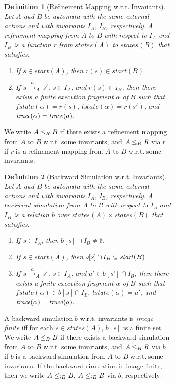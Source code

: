 \documentclass[11pt]{article}
\newcommand{\bn}{\begin{enumerate}}
\newcommand{\en}{\end{enumerate}}
\newcommand{\bd}{\begin{definition}}
\newcommand{\ed}{\end{definition}}
\newcommand{\intrdef}{\emph}	\newcommand{\intr}{\emph}
\newcommand{\ints}{\cap}
\newcommand{\lla}[2]{\mbox{$\, \stackrel{#1}{\longrightarrow}_{#2} \,$}}
\newcommand{\al}{\alpha}
\newcommand{\fstate}{\mathit{fstate}}
\newcommand{\lstate}{\mathit{lstate}}
\newcommand{\start}{\mathit{start}}
\newcommand{\states}{\mathit{states}}
\newtheorem{definition}{Definition}
\begin{document}
\begin{figure}[htb]
\begin{figure}[htb]
\bd[Refinement Mapping w.r.t. Invariants]
Let $A$ and $B$ be automata with the same external actions and with
invariants $I_A$, $I_B$, respectively. A \intrdef{refinement mapping}
from $A$ to $B$ with respect to $I_A$ and $I_B$
is a function $r$ from $\states(A)$ to $\states(B)$
that satisfies:
\bn

\item \label{clause:ref-inv:init} If $s \in \start(A)$, then
$r(s) \in \start(B)$.


\item \label{clause:ref-inv:trans}
If $s \lla{a}{A} s'$, $s \in I_A$, and $r(s) \in I_B$, then
there exists a finite execution fragment $\al$ of $B$ such that
$\fstate(\al) = r(s)$, 
$\lstate(\al) = r(s')$, and $\trace(\al) = \trace(a)$.

\en
\label{def:ref-inv}
\ed
We write $A \leq_R B$ if there exists a refinement mapping from $A$
to $B$ w.r.t. some invariants, and 
$A \leq_R B$ via $r$ if $r$ is a refinement mapping from
$A$ to $B$ w.r.t. some invariants.




\bd[Backward Simulation w.r.t. Invariants]
Let $A$ and $B$ be automata with the same external actions and with
invariants $I_A$, $I_B$, respectively. A \intrdef{backward simulation}
from $A$ to $B$ with respect to $I_A$ and $I_B$
is a relation $b$ over $\states(A) \times \states(B)$
that satisfies:
\bn

\item If $s \in I_A$, then $b[s] \ints I_B \ne \emptyset$.

\item \label{clause:back-sim-inv:init} 
If $s \in \start(A)$, then $b[s] \ints I_B \sub \start(B)$.


\item \label{clause:back-sim-inv:trans}
If $s \lla{a}{A} s'$, $s \in I_A$, and $u' \in b[s'] \ints I_B$, then
there exists a finite execution fragment $\al$ of $B$ such that
$\fstate(\al) \in b[s] \ints I_B$, 
$\lstate(\al) = u'$, and
$\trace(\al) = \trace(a)$.

\en
\label{def:back-sim-inv}
\ed
A backward simulation $b$ w.r.t. invariants is \intr{image-finite} iff
for each $s \in \states(A)$, $b[s]$ is a finite set.
We write $A \leq_B B$ if there exists a backward simulation from $A$
to $B$ w.r.t. some invariants, and 
$A \leq_B B$ via $b$ if $b$ is a backward simulation from
$A$ to $B$ w.r.t. some invariants.
If the backward simulation is image-finite, then we write 
$A \leq_{iB} B$, $A \leq_{iB} B$ via $b$, respectively.



\end{figure}
\end{figure}
\end{document}
